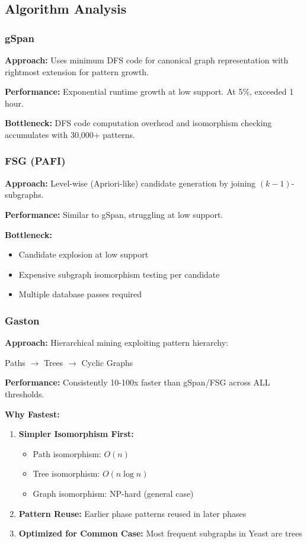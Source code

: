 \documentclass[11pt,a4paper]{article}
\begin{document}
\subsection{Algorithm Analysis}

\subsubsection{gSpan}

\textbf{Approach:} Uses minimum DFS code for canonical graph representation with rightmost extension for pattern growth.

\textbf{Performance:} Exponential runtime growth at low support. At 5\%, exceeded 1 hour.

\textbf{Bottleneck:} DFS code computation overhead and isomorphism checking accumulates with 30,000+ patterns.

\subsubsection{FSG (PAFI)}

\textbf{Approach:} Level-wise (Apriori-like) candidate generation by joining $(k-1)$-subgraphs.

\textbf{Performance:} Similar to gSpan, struggling at low support.

\textbf{Bottleneck:}
\begin{itemize}
    \item Candidate explosion at low support
    \item Expensive subgraph isomorphism testing per candidate
    \item Multiple database passes required
\end{itemize}

\subsubsection{Gaston}

\textbf{Approach:} Hierarchical mining exploiting pattern hierarchy:
\begin{center}
Paths $\rightarrow$ Trees $\rightarrow$ Cyclic Graphs
\end{center}

\textbf{Performance:} Consistently 10-100x faster than gSpan/FSG across ALL thresholds.

\textbf{Why Fastest:}
\begin{enumerate}
    \item \textbf{Simpler Isomorphism First:}
    \begin{itemize}
        \item Path isomorphism: $O(n)$
        \item Tree isomorphism: $O(n \log n)$
        \item Graph isomorphism: NP-hard (general case)
    \end{itemize}
    \item \textbf{Pattern Reuse:} Earlier phase patterns reused in later phases
    \item \textbf{Optimized for Common Case:} Most frequent subgraphs in Yeast are trees
\end{enumerate}
\end{document}
